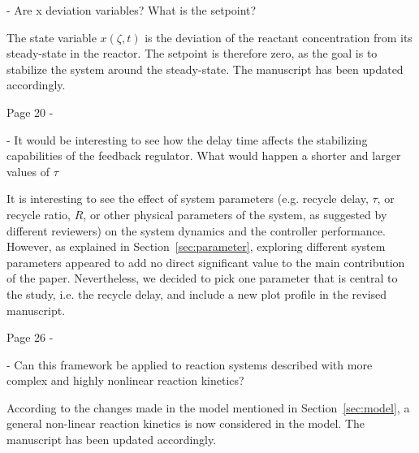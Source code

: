 \documentclass[12pt,answers]{exam}
\begin{document}
\begin{questions}
    - Are x deviation variables? What is the setpoint?

    \begin{solutionorbox}
        The state variable $x(\zeta,t)$ is the deviation of the reactant concentration from its steady-state in the reactor. The setpoint is therefore zero, as the goal is to stabilize the system around the steady-state. The manuscript has been updated accordingly.
    \end{solutionorbox}


    \question Page 20 - 

    - It would be interesting to see how the delay time affects the stabilizing capabilities of the feedback regulator. What would happen a shorter and larger values of $\tau$

    \begin{solutionorbox}
        It is interesting to see the effect of system parameters (e.g. recycle delay, $\tau$, or recycle ratio, $R$, or other physical parameters of the system, as suggested by different reviewers) on the system dynamics and the controller performance. However, as explained in Section~\ref{sec:parameter}, exploring different system parameters appeared to add no direct significant value to the main contribution of the paper. Nevertheless, we decided to pick one parameter that is central to the study, i.e. the recycle delay, and include a new plot profile in the revised manuscript. 
        
    \end{solutionorbox}


    \question Page 26 - 

    - Can this framework be applied to reaction systems described with more complex and highly nonlinear reaction kinetics?

    \begin{solutionorbox}
        According to the changes made in the model mentioned in Section~\ref{sec:model}, a general non-linear reaction kinetics is now considered in the model. The manuscript has been updated accordingly.
    \end{solutionorbox}


\end{questions}
\end{document}
